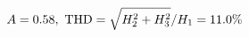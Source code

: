 \documentclass[preview]{standalone}
\begin{document}
\begin{align*}
\special{dvisvgm:raw <g id='unique000'>}A=0.58,\ \text{THD}=\sqrt{H_2^2+H_3^2}/H_1=11.0\%\special{dvisvgm:raw </g>}
\end{align*}
\end{document}
